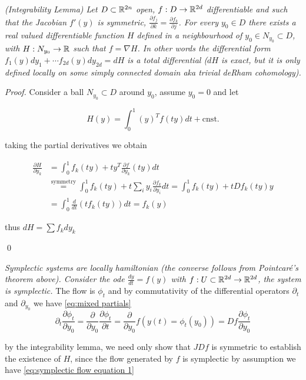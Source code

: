 \documentclass[12pt]{article}
\begin{document}
 \textit{(Integrability Lemma) \cite{Numerical} Let $D\subset \mathbb{R}^{2n}$ open, $f: D\to \mathbb{R}^{2d}$ differentiable and such that the Jacobian $f'(y)$ is symmetric, $\frac{\partial f_j}{\partial k} = \frac{\partial f_k}{\partial j}$. For every $y_0\in D$ there exists a real valued differentiable function $H$ defined in a neighbourhood of $y_0\in N_{y_0}\subset D$, with $H:N_{y_0}\to\mathbb{R}$ such that $f = \nabla H$. In other words the differential form $f_1(y)dy_1 + \cdots f_{2d}(y)dy_{2d} = dH$ is a total differential ($dH$ is exact, but it is only defined locally on some simply connected domain aka trivial deRham cohomology).} 

\textit{Proof.} Consider a ball $N_{y_0}\subset D$ around $y_0$, assume $y_0=0$ and let 

$$
H(y) = \int_0^1 (y)^Tf(ty) dt + \text{cnst.}
$$

taking the partial derivatives we obtain

\begin{equation}\label{eq:hamiltonian differential}
\begin{split}
    \frac{\partial H}{\partial y_k} & = \int_0^1 f_k(ty) + t y^T\frac{\partial f}{\partial y_k}(ty) dt \\
    & \stackrel{\text{symmetry}}{=} \int_0^1 f_k(ty) + t\sum_i y_i\frac{\partial f_k}{\partial y_i} dt = \int_0^1 f_k(ty) + t D f_k(ty) y\\
    & = \int_0^1 \frac{d}{dt}\left( t f_k(ty) \right) dt = f_k(y)
\end{split}
\end{equation}

thus $dH = \sum f_k dy_k$

\qed

 \textit{Symplectic systems are locally hamiltonian (the converse follows from Pointcar\'e's theorem above). Consider the ode $\frac{dy}{dt} = f(y)$ with $f : U\subset \mathbb{R}^{2d}\to \mathbb{R}^{2d}$, the system is symplectic.} The flow is $\phi_t$ and by commutativity of the differential operators $\partial_t$ and $\partial_{y_0}$ we have \eqref{eq:mixed partials}
\begin{equation}\label{eq:mixed partials}
\partial_t \frac{\partial \phi_t}{\partial y_0} = \frac{\partial }{\partial y_0}\frac{\partial \phi_t}{\partial t} = \frac{\partial }{\partial y_0}f\left(y(t)=\phi_t(y_0)\right) = Df \frac{\partial \phi_t}{\partial y_0}
\end{equation}

by the integrability lemma, we need only show that $JDf$ is symmetric to establish the existence of $H$, since the flow generated by $f$ is symplectic by assumption we have \eqref{eq:symplectic flow equation 1} 
\end{document}
